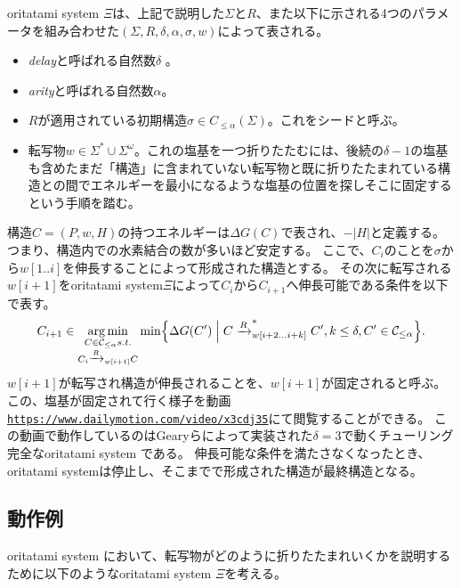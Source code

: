 \documentclass[a4,11pt]{article}
\DeclareMathOperator*{\argmin}{arg\,min}
\begin{document}
oritatami system $\Xi$は、上記で説明した$\Sigma$と$R$、また以下に示される4つのパラメータを組み合わせた$(\Sigma, R, \delta, \alpha, \sigma, w)$によって表される。
%
\begin{itemize}
\item \textit{delay}と呼ばれる自然数$\delta$ 。
\item \textit{arity}と呼ばれる自然数$\alpha$。
\item $R$が適用されている初期構造$\sigma \in C_{\le \alpha}(\Sigma)$。これをシードと呼ぶ。
\item 転写物$w \in \Sigma^* \cup \Sigma^\omega$。これの塩基を一つ折りたたむには、後続の$\delta{-}1$の塩基も含めたまだ「構造」に含まれていない転写物と既に折りたたまれている構造との間でエネルギーを最小になるような塩基の位置を探しそこに固定するという手順を踏む。
\end{itemize}
%
構造$C = (P, w, H)$の持つエネルギーは$\Delta G(C)$で表され、${-}|H|$と定義する。
つまり、構造内での水素結合の数が多いほど安定する。
ここで、$C_i$のことを$\sigma$から$w[1..i]$を伸長することによって形成された構造とする。
その次に転写される$w[i+1]$をoritatami system$\Xi$によって$C_i$から$C_{i+1}$へ伸長可能である条件を以下で表す。
%
\begin{equation}
\label{eq:OS_CF}
C_{i+1} \in \argmin_{
\substack{
C \in \mathcal{C}_{\le \alpha} s.t. \\
C_i \xrightarrow{R}_{w[i+1]}C \\
}
}
\min \Bigl\{ \Delta G(C') \Bigm|
C \xrightarrow{R}^*_{w[i+2...i+k]}C', k\le \delta, C' \in \mathcal{C}_{\le \alpha}
\Bigr\}.
\end{equation}
%
$w[i+1]$が転写され構造が伸長されることを、$w[i+1]$が固定されると呼ぶ。
この、塩基が固定されて行く様子を動画\href{https://www.dailymotion.com/video/x3cdj35}{\tt https://www.dailymotion.com/video/x3cdj35}にて閲覧することができる。
この動画で動作しているのはGearyらによって実装された$\delta = 3$で動くチューリング完全なoritatami system\cite{GeMeScSe2018} である。
伸長可能な条件を満たさなくなったとき、oritatami systemは停止し、そこまでで形成された構造が最終構造となる。





\newpage
\subsection{動作例}
oritatami system において、転写物がどのように折りたたまれいくかを説明するために以下のようなoritatami system $\Xi$を考える。
\end{document}
